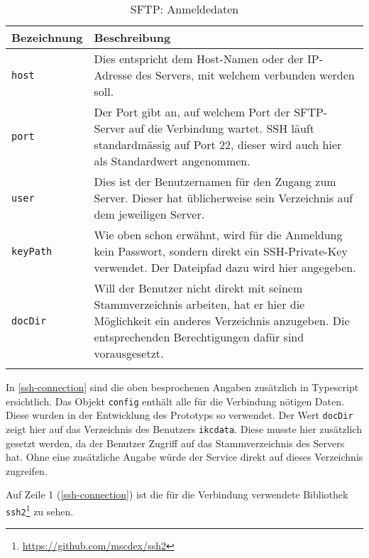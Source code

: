 \begin{longtable}{|p{4cm}| p{8cm}|}
  \hline
    \textbf{Bezeichnung} & \textbf{Beschreibung}\\\hline
    \texttt{host} & Dies entspricht dem Host-Namen oder der IP-Adresse des Servers, mit welchem verbunden werden soll.\\\hline
    \texttt{port} & Der Port gibt an, auf welchem Port der \gls{SFTP}-Server auf die Verbindung wartet. \gls{SSH} läuft standardmässig auf Port 22, dieser wird auch hier als Standardwert angenommen.\\\hline
    \texttt{user} & Dies ist der Benutzernamen für den Zugang zum Server. Dieser hat üblicherweise sein Verzeichnis auf dem jeweiligen Server.\\\hline
    \texttt{keyPath} & Wie oben schon erwähnt, wird für die Anmeldung kein Passwort, sondern direkt ein SSH-Private-Key verwendet. Der Dateipfad dazu wird hier angegeben.\\\hline
    \texttt{docDir} & Will der Benutzer nicht direkt mit seinem Stammverzeichnis arbeiten, hat er hier die Möglichkeit ein anderes Verzeichnis anzugeben. Die entsprechenden Berechtigungen dafür sind vorausgesetzt.\\\hline
        \caption{SFTP: Anmeldedaten}
    \label{sftp-anmeldung}
\end{longtable}


In \autoref{ssh-connection} sind die oben besprochenen Angaben zusätzlich in \gls{Typescript} ersichtlich. Das Objekt \texttt{config} enthält alle für die Verbindung nötigen Daten. Diese wurden in der Entwicklung des Prototyps so verwendet. Der Wert \texttt{docDir} zeigt hier auf das Verzeichnis des Benutzers \texttt{ikcdata}. Diese musste hier zusätzlich gesetzt werden, da der Benutzer Zugriff auf das Stammverzeichnis des Servers hat. Ohne eine zusätzliche Angabe würde der Service direkt auf dieses Verzeichnis zugreifen.



Auf Zeile 1 (\autoref{ssh-connection}) ist die für die Verbindung verwendete Bibliothek \texttt{ssh2}\footnote{\url{https://github.com/mscdex/ssh2}} zu sehen.



